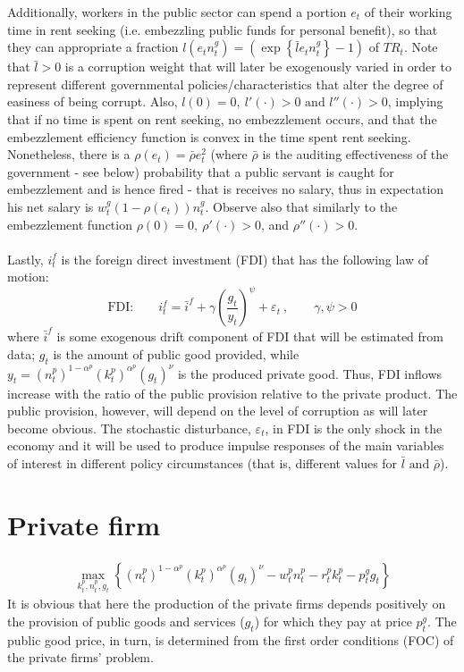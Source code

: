 \documentclass[]{scrartcl}
\begin{document}
Additionally, workers in the public sector can spend a portion $ e_t $ of their working time in rent seeking (i.e. embezzling public funds for personal benefit), so that they can appropriate a fraction $ l(e_tn^g_t)=\left( \exp\left\lbrace \bar{l}e_tn^g_t \right\rbrace-1 \right) $ of $ TR_t $. Note that $ \bar{l}>0 $ is a corruption weight that will later be exogenously varied in order to represent different governmental policies/characteristics that alter the degree of easiness of being corrupt. Also, $ l(0)=0,~l'(\cdot)>0\text{ and } l''(\cdot)>0 $, implying that if no time is spent on rent seeking, no embezzlement occurs, and that the embezzlement efficiency function is convex in the time spent rent seeking. Nonetheless, there is a $ \rho(e_t)=\bar{\rho}e_t^2 $ (where $ \bar{\rho} $ is the auditing effectiveness of the government - see below) probability that a public servant is caught for embezzlement and is hence fired - that is receives no salary, thus in expectation his net salary is $ w^g_t (1-\rho(e_t))n^g_t $. Observe also that similarly to the embezzlement function $ \rho(0)=0,~\rho'(\cdot)>0 $, and $ \rho''(\cdot)>0 $. \\\\
Lastly, $ i^f_t $ is the foreign direct investment (FDI) that has the following law of motion:
\begin{equation}
\text{FDI:}\qquad i^f_t=\bar{i}^f+\gamma\left( \frac{g_t}{y_t} \right)^\psi+\varepsilon_t~, \qquad \gamma,\psi>0
\end{equation}
where $ \bar{i}^f $ is some exogenous drift component of FDI that will be estimated from data; $ g_t $ is the amount of public good provided, while $ y_t=(n_t^p)^{1-\alpha^p}(k_t^p)^{\alpha^p}(g_t)^\nu $ is the produced private good. Thus, FDI inflows increase with the ratio of the public provision relative to the private product. The public provision, however, will depend on the level of corruption as will later become obvious. The stochastic disturbance, $ \varepsilon_t $, in FDI is the only shock in the economy and it will be used to produce impulse responses of the main variables of interest in different policy circumstances (that is, different values for $ \bar{l}\text{ and } \bar{\rho} $).

\section{Private firm}
\begin{align}
\max_{k_t^p,n_t^p,g_t}\left\lbrace (n_t^p)^{1-\alpha^p}(k_t^p)^{\alpha^p}(g_t)^\nu-w^p_tn^p_t-r^p_tk_t^p-p^g_tg_t \right\rbrace
\end{align}
It is obvious that here the production of the private firms depends positively on the provision of public goods and services ($ g_t $) for which they pay at price $ p_t^g $. The public good price, in turn, is determined from the first order conditions (FOC) of the private firms' problem.
\end{document}
